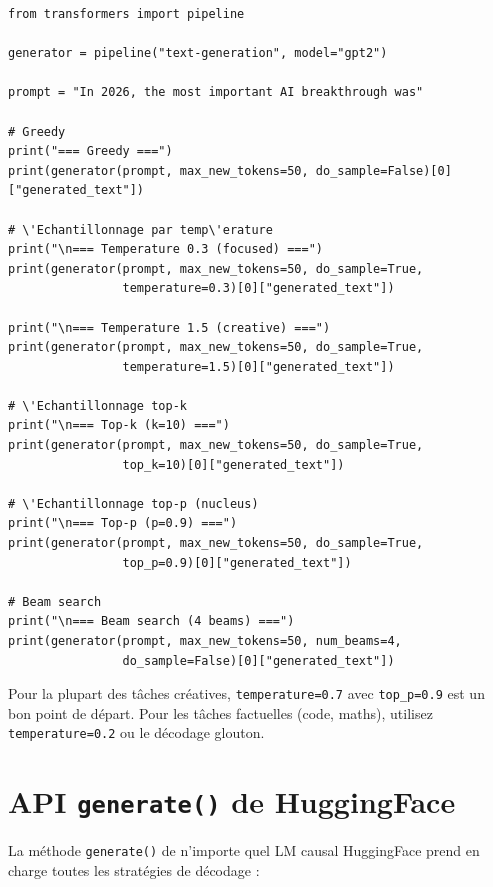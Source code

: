 \begin{verbatim}
from transformers import pipeline

generator = pipeline("text-generation", model="gpt2")

prompt = "In 2026, the most important AI breakthrough was"

# Greedy
print("=== Greedy ===")
print(generator(prompt, max_new_tokens=50, do_sample=False)[0]["generated_text"])

# \'Echantillonnage par temp\'erature
print("\n=== Temperature 0.3 (focused) ===")
print(generator(prompt, max_new_tokens=50, do_sample=True,
                temperature=0.3)[0]["generated_text"])

print("\n=== Temperature 1.5 (creative) ===")
print(generator(prompt, max_new_tokens=50, do_sample=True,
                temperature=1.5)[0]["generated_text"])

# \'Echantillonnage top-k
print("\n=== Top-k (k=10) ===")
print(generator(prompt, max_new_tokens=50, do_sample=True,
                top_k=10)[0]["generated_text"])

# \'Echantillonnage top-p (nucleus)
print("\n=== Top-p (p=0.9) ===")
print(generator(prompt, max_new_tokens=50, do_sample=True,
                top_p=0.9)[0]["generated_text"])

# Beam search
print("\n=== Beam search (4 beams) ===")
print(generator(prompt, max_new_tokens=50, num_beams=4,
                do_sample=False)[0]["generated_text"])
\end{verbatim}

\begin{aitip}
Pour la plupart des t\^aches cr\'eatives, \texttt{temperature=0.7} avec \texttt{top\_p=0.9} est un bon point de d\'epart. Pour les t\^aches factuelles (code, maths), utilisez \texttt{temperature=0.2} ou le d\'ecodage glouton.
\end{aitip}

\section{API \texttt{generate()} de HuggingFace}

La m\'ethode \texttt{generate()} de n'importe quel LM causal HuggingFace prend en charge toutes les strat\'egies de d\'ecodage :

